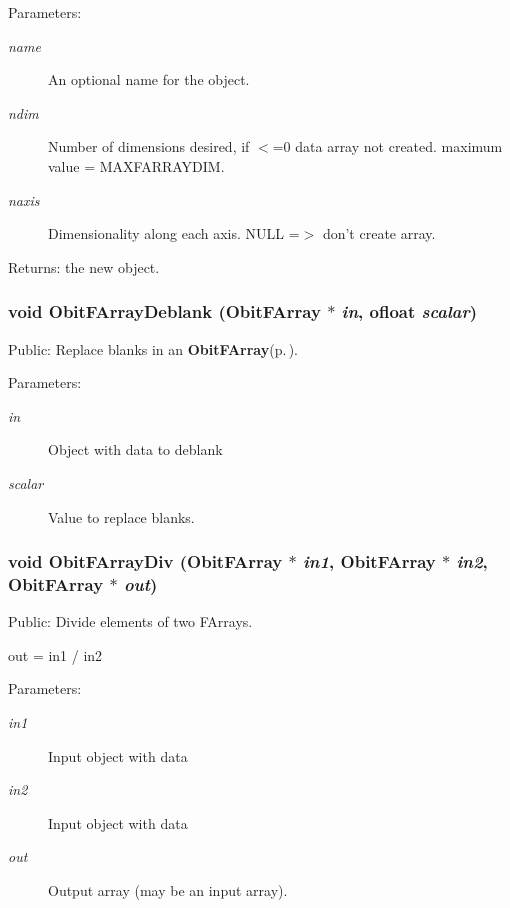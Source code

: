 \begin{Desc}
\item[Parameters:]
\begin{description}
\item[{\em name}]An optional name for the object. \item[{\em ndim}]Number of dimensions desired, if $<$=0 data array not created. maximum value = MAXFARRAYDIM. \item[{\em naxis}]Dimensionality along each axis. NULL =$>$ don't create array. \end{description}
\end{Desc}
\begin{Desc}
\item[Returns:]the new object. \end{Desc}
\subsubsection{\setlength{\rightskip}{0pt plus 5cm}void Obit\-FArray\-Deblank ({\bf Obit\-FArray} $\ast$ {\em in}, {\bf ofloat} {\em scalar})}\label{ObitFArray_8h_a68}


Public: Replace blanks in an {\bf Obit\-FArray}{\rm (p.\,\pageref{structObitFArray})}. 

\begin{Desc}
\item[Parameters:]
\begin{description}
\item[{\em in}]Object with data to deblank \item[{\em scalar}]Value to replace blanks. \end{description}
\end{Desc}
\subsubsection{\setlength{\rightskip}{0pt plus 5cm}void Obit\-FArray\-Div ({\bf Obit\-FArray} $\ast$ {\em in1}, {\bf Obit\-FArray} $\ast$ {\em in2}, {\bf Obit\-FArray} $\ast$ {\em out})}\label{ObitFArray_8h_a96}


Public: Divide elements of two FArrays. 

out = in1 / in2 \begin{Desc}
\item[Parameters:]
\begin{description}
\item[{\em in1}]Input object with data \item[{\em in2}]Input object with data \item[{\em out}]Output array (may be an input array). \end{description}
\end{Desc}

